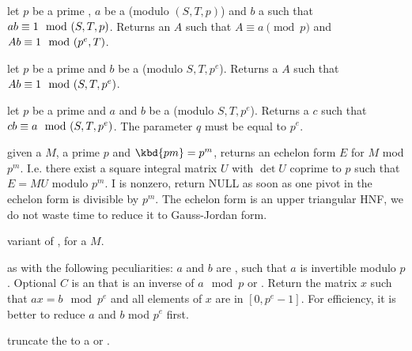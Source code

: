 




 let
$p$ be a prime , $a$ be a  (modulo $(S, T, p)$) and
$b$ a  such that $a\*b \equiv 1 \mod (S, T, p)$.
Returns an  $A$ such that $A \equiv a \pmod{p}$ and
$A\*b \equiv 1 \mod (p^e, T)$.

 let
$p$ be a prime  and $b$ be a  (modulo $S, T, p^e$).
Returns a  $A$ such that $A\*b \equiv 1 \mod (S, T, p^e)$.

 let
$p$ be a prime  and $a$ and $b$ be a  (modulo $S, T, p^e$).
Returns a  $c$ such that $c\*b \equiv a \mod (S, T, p^e)$.
The parameter $q$ must be equal to $p^e$.


 given a
 $M$, a prime $p$ and $\kbd{pm} = p^m$, returns an echelon form
$E$ for $M$ mod $p^m$. I.e. there exist a square integral matrix $U$ with
$\det U$ coprime to $p$ such that $E = MU$ modulo $p^m$. I
 is nonzero, return NULL as soon as one pivot in
the echelon form is divisible by $p^m$. The echelon form is an upper
triangular HNF, we do not waste time to reduce it to Gauss-Jordan form.

variant of , for a  $M$.

 as 
with the following peculiarities: $a$ and $b$ are , such that $a$ is
invertible modulo $p$. Optional $C$ is an  that is an inverse of
$a\mod p$ or . Return the matrix $x$ such that $ax=b\mod p^e$ and
all elements of $x$ are in $[0,p^e-1]$. For efficiency, it is better
to reduce $a$ and $b$ mod $p^e$ first.

 truncate the  to a  or
.

